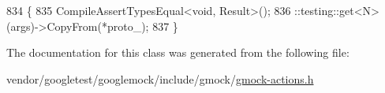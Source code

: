 \begin{DoxyCode}
834                                                 \{
835     CompileAssertTypesEqual<void, Result>();
836     ::testing::get<N>(args)->CopyFrom(*proto\_);
837   \}
\end{DoxyCode}


The documentation for this class was generated from the following file\+:\begin{DoxyCompactItemize}
\item 
vendor/googletest/googlemock/include/gmock/\hyperlink{gmock-actions_8h}{gmock-\/actions.\+h}\end{DoxyCompactItemize}
